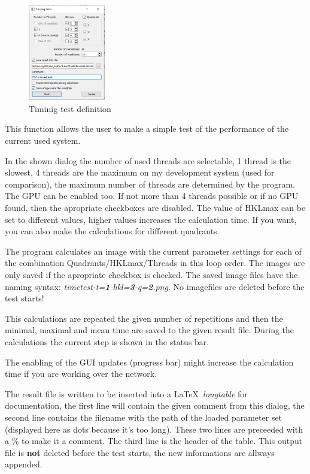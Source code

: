 \documentclass[11pt]{article} %
\begin{document}
\begin{figure}
  \begin{center}
    \includegraphics[width=0.3\textwidth]{timing_test.png}
  \end{center}
 \caption{Timinig test definition}
\end{figure}

This function allows the user to make a simple test of the performance of the current used system.

In the shown dialog the number of used threads are selectable, 1 thread is the slowest, 4 threads are the maximum on my development system (used for comparison), the maximum number of threads are determined by the program. The GPU can be enabled too. If not more than 4 threads possible or if no GPU found, then the apropriate checkboxes are disabled. The value of HKLmax can be set to different values, higher values increases the calculation time. If you want, you can also make the calculations for different quadrants.

The program calculates an image with the current parameter settings for each of the combination Quadrants/HKLmax/Threads in this loop order. The images are only saved if the apropriate checkbox is checked. The saved image files have the naming syntax: {\it timetest-t={\bf 1}-hkl={\bf 3}-q={\bf 2}.png}. No imagefiles are deleted before the test starts!

This calculations are repeated the given number of repetitions and then the minimal, maximal and mean time are saved to the given result file. During the calculations the current step is shown in the status bar.

The enabling of the GUI updates (progress bar) might increase the calculation time if you are working over the network.

The result file is written to be inserted into a \LaTeX\  {\it longtable} for documentation, the first line will contain the given comment from this dialog, the second line contains the filename with the path of the loaded parameter set (displayed here as dots because it's too long). These two lines are preceeded with a \% to make it a comment. The third line is the header of the table. This output file is {\bf not} deleted before the test starts, the new informations are allways appended.
\end{document}
